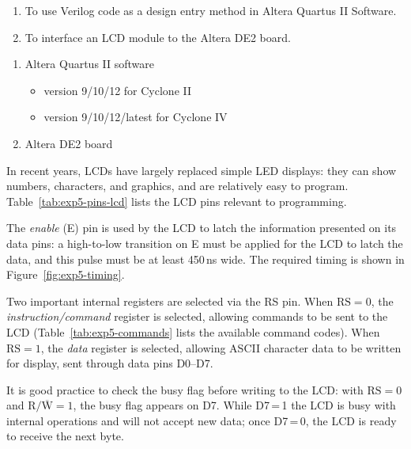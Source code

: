 
\begin{objectives}
    \begin{enumerate}
        \item To use Verilog code as a design entry method in Altera Quartus II Software.
        \item To interface an LCD module to the Altera DE2 board.
    \end{enumerate}
\end{objectives}

\begin{equipment}
    \begin{enumerate}
        \item Altera Quartus II software
              \begin{itemize}
                  \item version 9/10/12 for Cyclone II
                  \item version 9/10/12/latest for Cyclone IV
              \end{itemize}
        \item Altera DE2 board
    \end{enumerate}
\end{equipment}

\begin{introduction}
    In recent years, LCDs have largely replaced simple LED displays: they can show numbers, characters, and graphics, and are relatively easy to program. Table~\ref{tab:exp5-pins-lcd} lists the LCD pins relevant to programming.
    \vspace*{10pt}

    The \textit{enable} (E) pin is used by the LCD to latch the information presented on its data pins: a high-to-low transition on E must be applied for the LCD to latch the data, and this pulse must be at least 450\,ns wide. The required timing is shown in Figure~\ref{fig:exp5-timing}.
    \vspace*{10pt}

    Two important internal registers are selected via the RS pin. When $\text{RS}=0$, the \textit{instruction/command} register is selected, allowing commands to be sent to the LCD (Table~\ref{tab:exp5-commands} lists the available command codes). When $\text{RS}=1$, the \textit{data} register is selected, allowing ASCII character data to be written for display, sent through data pins D0--D7.
    \vspace*{10pt}

    It is good practice to check the busy flag before writing to the LCD: with $\text{RS}=0$ and $\text{R}/\overline{\text{W}}=1$, the busy flag appears on D7. While D7\,=\,1 the LCD is busy with internal operations and will not accept new data; once D7\,=\,0, the LCD is ready to receive the next byte.
\end{introduction}


